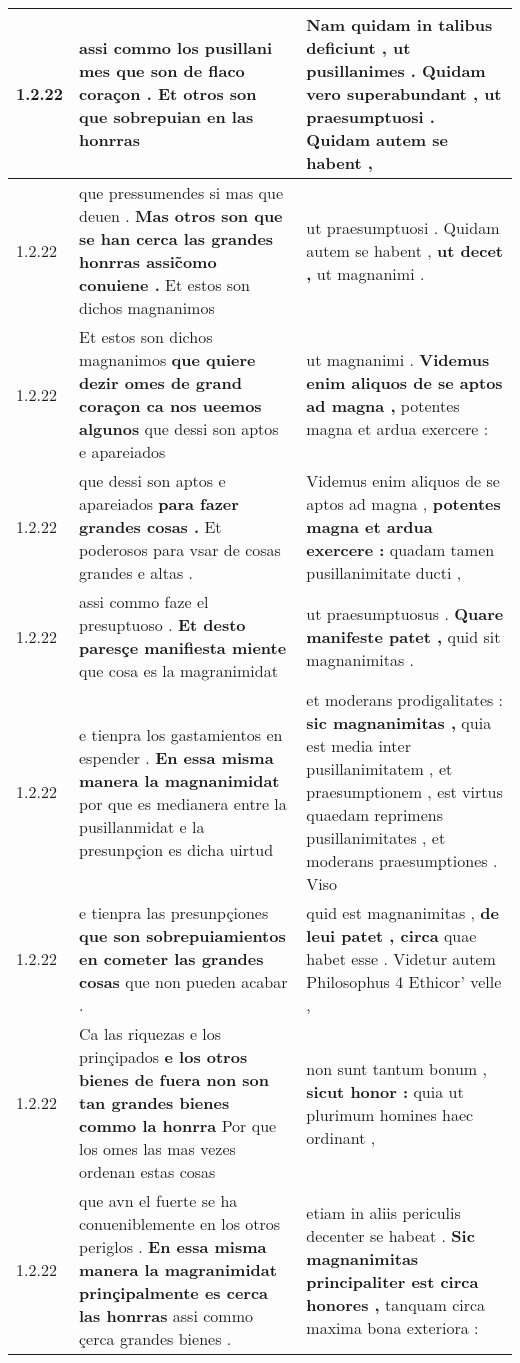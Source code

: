 \begin{tabular}{|p{1cm}|p{6.5cm}|p{6.5cm}|}
1.2.22 & assi commo los pusillani mes \textbf{ que son de flaco coraçon . } Et otros son que sobrepuian en las honrras & Nam quidam in talibus deficiunt , \textbf{ ut pusillanimes . Quidam vero superabundant , } ut praesumptuosi . Quidam autem se habent , \\\hline
1.2.22 & que pressumendes si mas que deuen . \textbf{ Mas otros son que se han cerca las grandes honrras assic̃omo conuiene . } Et estos son dichos magnanimos & ut praesumptuosi . Quidam autem se habent , \textbf{ ut decet , } ut magnanimi . \\\hline
1.2.22 & Et estos son dichos magnanimos \textbf{ que quiere dezir omes de grand coraçon ca nos ueemos algunos } que dessi son aptos e apareiados & ut magnanimi . \textbf{ Videmus enim aliquos de se aptos ad magna , } potentes magna et ardua exercere : \\\hline
1.2.22 & que dessi son aptos e apareiados \textbf{ para fazer grandes cosas . } Et poderosos para vsar de cosas grandes e altas . & Videmus enim aliquos de se aptos ad magna , \textbf{ potentes magna et ardua exercere : } quadam tamen pusillanimitate ducti , \\\hline
1.2.22 & assi commo faze el presuptuoso . \textbf{ Et desto paresçe manifiesta miente } que cosa es la magranimidat & ut praesumptuosus . \textbf{ Quare manifeste patet , } quid sit magnanimitas . \\\hline
1.2.22 & e tienpra los gastamientos en espender . \textbf{ En essa misma manera la magnanimidat } por que es medianera entre la pusillanmidat e la presunpçion es dicha uirtud & et moderans prodigalitates : \textbf{ sic magnanimitas , } quia est media inter pusillanimitatem , et praesumptionem , est virtus quaedam reprimens pusillanimitates , et moderans praesumptiones . Viso \\\hline
1.2.22 & e tienpra las presunpçiones \textbf{ que son sobrepuiamientos en cometer las grandes cosas } que non pueden acabar . & quid est magnanimitas , \textbf{ de leui patet , circa } quae habet esse . Videtur autem Philosophus 4 Ethicor’ velle , \\\hline
1.2.22 & Ca las riquezas e los prinçipados \textbf{ e los otros bienes de fuera non son tan grandes bienes commo la honrra } Por que los omes las mas vezes ordenan estas cosas & non sunt tantum bonum , \textbf{ sicut honor : } quia ut plurimum homines haec ordinant , \\\hline
1.2.22 & que avn el fuerte se ha conueniblemente en los otros periglos . \textbf{ En essa misma manera la magranimidat prinçipalmente es cerca las honrras } assi commo çerca grandes bienes . & etiam in aliis periculis decenter se habeat . \textbf{ Sic magnanimitas principaliter est circa honores , } tanquam circa maxima bona exteriora : \\\hline

\end{tabular}
